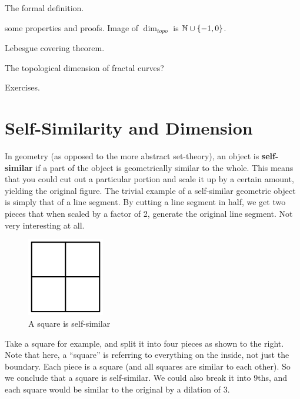 The formal definition. \par

some properties and proofs. Image of $\dim_{topo}$ is $\mathbb{N}\cup\{-1,0\}$. \par

Lebesgue covering theorem. \par

The topological dimension of fractal curves? \par

Exercises. \par



\clearpage

\section{Self-Similarity and Dimension}

In geometry (as opposed to the more abstract set-theory), an object is \textbf{self-similar} if a part of the object is geometrically similar to the whole. This means that you could cut out a particular portion and scale it up by a certain amount, yielding the original figure. The trivial example of a self-similar geometric object is simply that of a line segment. By cutting a line segment in half, we get two pieces that when scaled by a factor of 2, generate the original line segment. Not very interesting at all.\par

\begin{figure}
  \begin{center}
    \includegraphics[width=0.3\textwidth]{Images/1.4.1.jpg}
  \end{center}
  \caption{A square is self-similar}
\end{figure}

Take a square for example, and split it into four pieces as shown to the right. Note that here, a ``square'' is referring to everything on the inside, not just the boundary. Each piece is a square (and all squares are similar to each other).  So we conclude that a square is self-similar. We could also break it into 9ths, and each square would be similar to the original by a dilation of 3.\par

